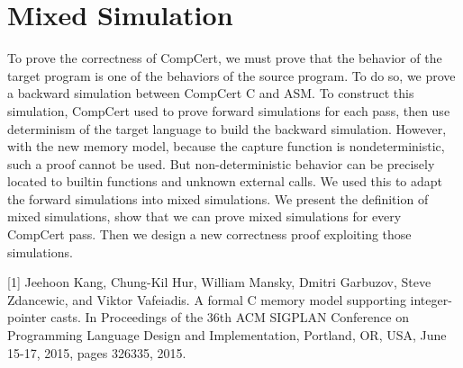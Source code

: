 \documentclass[nocopyrightspace]{sigplanconf}
\begin{document}
\section{Mixed Simulation}
To prove the correctness of CompCert, we must prove that the behavior of the target program is one of the behaviors of the source program. To do so, we prove a backward simulation between CompCert C and ASM. To construct this simulation, CompCert used to prove forward simulations for each pass, then use determinism of the target language to build the backward simulation. However, with the new memory model, because the capture function is nondeterministic, such a proof cannot be used. But non-deterministic behavior can be precisely located to builtin functions and unknown external calls. We used this to adapt the forward simulations into mixed simulations. We present the definition of mixed simulations, show that we can prove mixed simulations for every CompCert pass. Then we design a new correctness proof exploiting those simulations.





 [1] Jeehoon Kang, Chung-Kil Hur, William Mansky, Dmitri Garbuzov, Steve Zdancewic, and Viktor Vafeiadis. A formal C memory model supporting integer-pointer casts. In Proceedings of the 36th ACM SIGPLAN Conference on Programming Language Design and Implementation, Portland, OR, USA, June 15-17, 2015, pages 326335, 2015.
\end{document}
